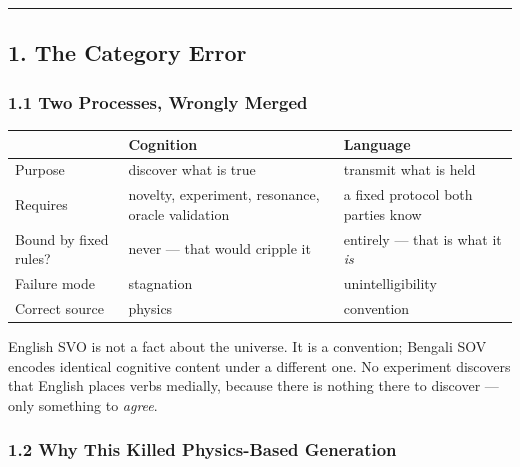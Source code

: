 \documentclass[
  11pt,
  a4paper,
]{article}
\begin{document}
\begin{center}\rule{0.5\linewidth}{0.5pt}\end{center}

\subsection{1. The Category Error}\label{the-category-error}

\subsubsection{1.1 Two Processes, Wrongly
Merged}\label{two-processes-wrongly-merged}

\begin{longtable}[]{@{}
  >{\raggedright\arraybackslash}p{}
  >{\raggedright\arraybackslash}p{}
  >{\raggedright\arraybackslash}p{}@{}}
\toprule\noalign{}
\begin{minipage}[b]{\linewidth}\raggedright
\end{minipage} & \begin{minipage}[b]{\linewidth}\raggedright
Cognition
\end{minipage} & \begin{minipage}[b]{\linewidth}\raggedright
Language
\end{minipage} \\
\midrule\noalign{}
\endhead
\bottomrule\noalign{}
\endlastfoot
Purpose & discover what is true & transmit what is held \\
Requires & novelty, experiment, resonance, oracle validation & a fixed
protocol both parties know \\
Bound by fixed rules? & never --- that would cripple it & entirely ---
that is what it \emph{is} \\
Failure mode & stagnation & unintelligibility \\
Correct source & physics & convention \\
\end{longtable}

English SVO is not a fact about the universe. It is a convention;
Bengali SOV encodes identical cognitive content under a different one.
No experiment discovers that English places verbs medially, because
there is nothing there to discover --- only something to \emph{agree}.

\subsubsection{1.2 Why This Killed Physics-Based
Generation}\label{why-this-killed-physics-based-generation}
\end{document}
